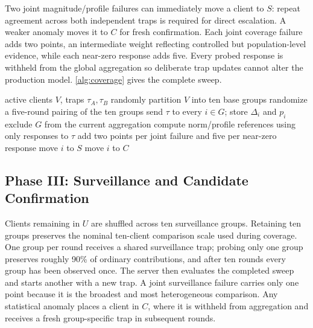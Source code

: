 \documentclass[conference]{IEEEtran}
\begin{document}
Two joint magnitude/profile failures can immediately move a client to $S$: repeat agreement across both independent traps is required for direct escalation. A weaker anomaly moves it to $C$ for fresh confirmation. Each joint coverage failure adds two points, an intermediate weight reflecting controlled but population-level evidence, while each near-zero response adds five. Every probed response is withheld from the global aggregation so deliberate trap updates cannot alter the production model. \autoref{alg:coverage} gives the complete sweep.

\begin{algorithm}[t]
\caption{Phase II: double coverage sweep}
\label{alg:coverage}
\begin{algorithmic}[1]
\Require active clients $V$, traps $\tau_A,\tau_B$
\State randomly partition $V$ into ten base groups
 \State randomize a five-round pairing of the ten groups
   \State send $\tau$ to every $i\in G$; store $\Delta_i$ and $p_i$
   \State exclude $G$ from the current aggregation
 \EndFor
 \State compute norm/profile references using only responses to $\tau$
\EndFor
{}
 \State add two points per joint failure and five per near-zero response
  \State move $i$ to $S$
  \State move $i$ to $C$
 \EndIf
\EndFor
\end{algorithmic}
\end{algorithm}

\subsection{Phase III: Surveillance and Candidate Confirmation}
Clients remaining in $U$ are shuffled across ten surveillance groups. Retaining ten groups preserves the nominal ten-client comparison scale used during coverage. One group per round receives a shared surveillance trap; probing only one group preserves roughly 90\% of ordinary contributions, and after ten rounds every group has been observed once. The server then evaluates the completed sweep and starts another with a new trap. A joint surveillance failure carries only one point because it is the broadest and most heterogeneous comparison. Any statistical anomaly places a client in $C$, where it is withheld from aggregation and receives a fresh group-specific trap in subsequent rounds.
\end{document}
